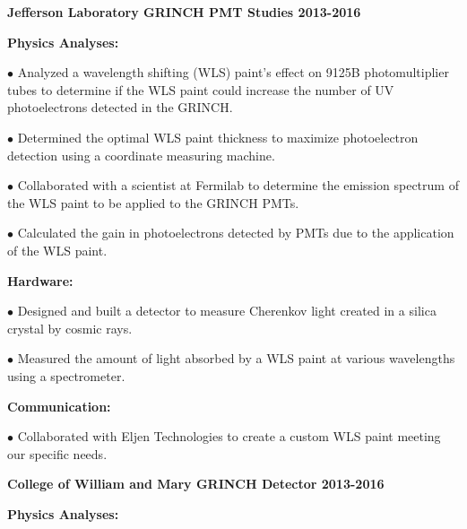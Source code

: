 \documentclass[letterpaper,10pt]{article}
\renewenvironment{itemize}{
  \begin{list}{}{
    \setlength{\leftmargin}{1.5em}
  }
}{
  \end{list}
}
\begin{document}
{\begin{itemize}
\vspace{3mm}

\item {\large {\bf Jefferson Laboratory GRINCH PMT Studies 2013-2016} }

 \begin{itemize}\itemsep5pt \parskip0pt 
  \item \textbf{Physics Analyses:}
   
    \begin{itemize}\itemsep5pt \parskip0pt 
     \item $\bullet$ Analyzed a wavelength shifting (WLS) paint's effect on 9125B photomultiplier tubes to determine if the WLS paint could increase the number of UV photoelectrons detected in the GRINCH. 
     \item $\bullet$ Determined the optimal WLS paint thickness to maximize photoelectron detection using a coordinate measuring machine.
     \item $\bullet$ Collaborated with a scientist at Fermilab to determine the emission spectrum of the WLS paint to be applied to the GRINCH PMTs.
     \item $\bullet$ Calculated the gain in photoelectrons detected by PMTs due to the application of the WLS paint. 
     \end{itemize}

  \item \textbf{Hardware:}
    \begin{itemize}\itemsep5pt \parskip0pt 
     \item $\bullet$ Designed and built a detector to measure Cherenkov light created in a silica crystal by cosmic rays. 
     \item $\bullet$ Measured the amount of light absorbed by a WLS paint at various wavelengths using a spectrometer. 
    \end{itemize}
    
  \item \textbf{Communication:}
	\begin{itemize}\itemsep5pt
		\item $\bullet$ Collaborated with Eljen Technologies to create a custom WLS paint meeting our specific needs.
	\end{itemize}
    
 \end{itemize}

\vspace{3mm}

\item {\large {\bf College of William and Mary GRINCH Detector 2013-2016} }
 \begin{itemize}\itemsep5pt \parskip0pt 
  \item \textbf{Physics Analyses:}
   

\end{itemize}
\end{itemize}}
\end{document}
